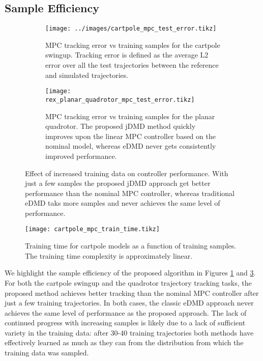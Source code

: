 \documentclass{article}
\begin{document}
\subsection{Sample Efficiency}
\begin{figure}[t]
  \centering
  \begin{subfigure}[t]{0.48\textwidth}
    \raggedleft
    \texttt{[image: ../images/cartpole\_mpc\_test\_error.tikz]}
    \caption{MPC tracking error vs training samples for the cartpole swingup. Tracking error
    is defined as the average L2 error over all the test trajectories between the reference
    and simulated trajectories.}
    \label{fig:cartpole_mpc_test_error}
  \end{subfigure}
  \hfill
  \begin{subfigure}[t]{0.48\textwidth}
    \raggedleft
    \texttt{[image: rex\_planar\_quadrotor\_mpc\_test\_error.tikz]}
    \caption{MPC tracking error vs training samples for the planar quadrotor. The proposed
    jDMD method quickly improves upon the linear MPC controller based on the nominal model,
    whereas eDMD never gets consistently improved performance.}
    \label{fig:rex_planar_quadrotor_mpc_test_error}
  \end{subfigure}
  \caption{Effect of increased training data on controller performance. With just a few 
    samples the proposed jDMD approach get better performance than the nominal 
    MPC controller, whereas traditional eDMD taks more samples and never achieves the same 
    level of performance.
    }
\end{figure}

\begin{figure}[t]
  \centering
  \texttt{[image: cartpole\_mpc\_train\_time.tikz]}
  \caption{Training time for cartpole models as a function of training samples. The 
  training time complexity is approximately linear.}
  \label{fig:cartpole_train_time}
\end{figure}



We highlight the sample efficiency of the proposed algorithm in Figures 
\ref{fig:cartpole_mpc_test_error} and \ref{fig:rex_planar_quadrotor_mpc_test_error}. For
both the cartpole swingup and the quadrotor trajectory tracking tasks, the proposed method
achieves better tracking than the nominal MPC controller after just a few training
trajectories. In both cases, the classic eDMD approach never achieves the same level of
performance as the proposed approach. The lack of continued progress with increasing samples
is likely due to a lack of sufficient variety in the training data: after 30-40 training
trajectories both methods have effectively learned as much as they can from the distribution
from which the training data was sampled.
\end{document}

